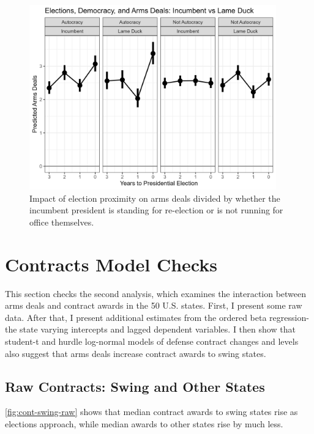 \documentclass[12pt]{article}
\begin{document}
\begin{figure}[htpb]
	\centering
		\includegraphics[width=0.95\textwidth]{incum-deals-pred.png}
	\caption{Impact of election proximity on arms deals divided by whether the incumbent president is standing for re-election or is not running for office themselves.}
	\label{fig:incum-deals-pred}
\end{figure}






\newpage



\section{Contracts Model Checks} 

This section checks the second analysis, which examines the interaction between arms deals and contract awards in the 50 U.S. states. 
First, I present some raw data. 
After that, I present additional estimates from the ordered beta regression- the state varying intercepts and lagged dependent variables. 
I then show that student-t and hurdle log-normal models of defense contract changes and levels also suggest that arms deals increase contract awards to swing states. 

\subsection{Raw Contracts: Swing and Other States}

\autoref{fig:cont-swing-raw} shows that median contract awards to swing states rise as elections approach, while median awards to other states rise by much less. 
\end{document}
